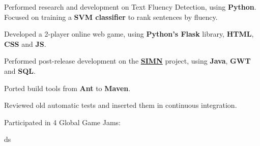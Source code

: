\documentclass[a4paper]{deedy-resume} %
\begin{document}
\begin{minipage}[t]{0.64\textwidth}
\sectionspace %


\href{https://unbabel.com/}{}
\begin{tightitemize}
    \item Performed research and development on Text Fluency Detection, using \textbf{Python}. Focused on training a \textbf{SVM classifier} to rank sentences by fluency.
    \item Developed a 2-player online web game, using \textbf{Python’s Flask} library, \textbf{HTML}, \textbf{CSS} and \textbf{JS}.
\end{tightitemize}

\sectionspace %


\href{http://www.opensoft.pt/}{}

\begin{tightitemize}
    \item Performed post-release development on the \textbf{\href{http://www.opensoft.pt/simn/}{SIMN}} project, using \textbf{Java}, \textbf{GWT} and \textbf{SQL}.
    \item Ported build tools from \textbf{Ant} to \textbf{Maven}.
    \item Reviewed old automatic tests and inserted them in continuous integration.
\end{tightitemize}

\sectionspace %



\href{https://nunoxu.github.io/#portfolio}{}

\begin{tightitemize}
    \item Participated in 4 Global Game Jams:
    \begin{tightitemize}
        \item ds
    \end{tightitemize}
\end{tightitemize}

\sectionspace %


\end{minipage}
\end{document}
